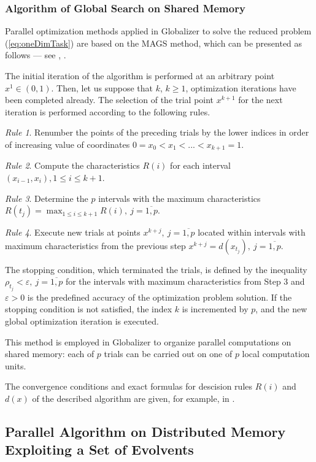 \documentclass{svproc}
\begin{document}
\subsubsection{Algorithm of Global Search on Shared Memory}
\label{sub:ags}
Parallel optimization methods applied in Globalizer to solve the reduced problem
(\ref{eq:oneDimTask}) are based on the MAGS method, which can be presented as follows ---
see \cite{strongin1978}, \cite{strSergGO}.
\par
The initial iteration of the algorithm is performed at an arbitrary point \mbox{\(x^1\in(0,1)\)}.
Then, let us suppose that \(k\), \(k\ge 1\), optimization iterations have been completed already.
The selection of the trial point \(x^{k+1}\) for the next iteration is performed according to the
following rules.

\textit{Rule 1}. Renumber the points of the preceding trials by the lower indices in order of
increasing value of coordinates
$0=x_0<x_1<...<x_{k+1}=1$.

\textit{Rule 2}. Compute the characteristics \(R(i)\) for each interval \((x_{i-1},x_i),1\leq i\leq
k+1\).

\textit{Rule 3}. Determine the \(p\) intervals with the maximum characteristics $R(t_j)=\max_{1\leq i
\leq k+1}R(i),\: j=\overline{1,p}$.

\textit{Rule 4}. Execute new trials at points \(x^{k+j},\: j=\overline{1,p}\) located within intervals with
maximum characteristics from the previous step
  $x^{k+j}=d(x_{t_j}),\: j=\overline{1,p}$.

The stopping condition, which terminated the trials, is defined by the inequality
$\rho_{t_j}<\varepsilon,\: j=\overline{1,p}$
for the intervals with maximum characteristics from Step 3 and \(\varepsilon >0\) is the
predefined accuracy of the optimization problem solution. If the stopping condition is not satisfied,
the index \(k\) is incremented by \(p\), and the new global optimization iteration is executed.

This method is employed in Globalizer to organize parallel computations on shared memory: each of \(p\)
trials can be carried out on one of \(p\) local computation units.

The convergence conditions and exact formulas for descision rules $R(i)$ and $d(x)$ of the
described algorithm are given, for example, in \cite{strSergGO}.

\subsection{Parallel Algorithm on Distributed Memory Exploiting a Set of Evolvents}
\end{document}
